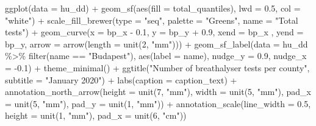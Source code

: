 \documentclass[
]{book}
\newenvironment{Shaded}{\begin{snugshade}}{\end{snugshade}}
\newcommand{\AttributeTok}[1]{\textcolor[rgb]{0.77,0.63,0.00}{#1}}
\newcommand{\DecValTok}[1]{\textcolor[rgb]{0.00,0.00,0.81}{#1}}
\newcommand{\FloatTok}[1]{\textcolor[rgb]{0.00,0.00,0.81}{#1}}
\newcommand{\FunctionTok}[1]{\textcolor[rgb]{0.00,0.00,0.00}{#1}}
\newcommand{\NormalTok}[1]{#1}
\newcommand{\SpecialCharTok}[1]{\textcolor[rgb]{0.00,0.00,0.00}{#1}}
\newcommand{\StringTok}[1]{\textcolor[rgb]{0.31,0.60,0.02}{#1}}
\begin{document}
\begin{Shaded}
\begin{Highlighting}[]
\FunctionTok{ggplot}\NormalTok{(}\AttributeTok{data =}\NormalTok{ hu\_dd) }\SpecialCharTok{+} 
  \FunctionTok{geom\_sf}\NormalTok{(}\FunctionTok{aes}\NormalTok{(}\AttributeTok{fill =}\NormalTok{ total\_quantiles), }\AttributeTok{lwd =} \FloatTok{0.5}\NormalTok{, }\AttributeTok{col =} \StringTok{"white"}\NormalTok{) }\SpecialCharTok{+} 
  \FunctionTok{scale\_fill\_brewer}\NormalTok{(}\AttributeTok{type =} \StringTok{"seq"}\NormalTok{, }\AttributeTok{palette =} \StringTok{"Greens"}\NormalTok{, }\AttributeTok{name =} \StringTok{"Total tests"}\NormalTok{) }\SpecialCharTok{+} 
  \FunctionTok{geom\_curve}\NormalTok{(}\AttributeTok{x =}\NormalTok{ bp\_x }\SpecialCharTok{{-}} \FloatTok{0.1}\NormalTok{, }
             \AttributeTok{y =}\NormalTok{ bp\_y }\SpecialCharTok{+} \FloatTok{0.9}\NormalTok{, }
             \AttributeTok{xend =}\NormalTok{ bp\_x , }
             \AttributeTok{yend =}\NormalTok{ bp\_y, }
             \AttributeTok{arrow =} \FunctionTok{arrow}\NormalTok{(}\AttributeTok{length =} \FunctionTok{unit}\NormalTok{(}\DecValTok{2}\NormalTok{, }\StringTok{"mm"}\NormalTok{))) }\SpecialCharTok{+}
  \FunctionTok{geom\_sf\_label}\NormalTok{(}\AttributeTok{data =}\NormalTok{ hu\_dd }\SpecialCharTok{\%\textgreater{}\%} \FunctionTok{filter}\NormalTok{(name }\SpecialCharTok{==} \StringTok{"Budapest"}\NormalTok{), }
                \FunctionTok{aes}\NormalTok{(}\AttributeTok{label =}\NormalTok{ name), }
                \AttributeTok{nudge\_y =} \FloatTok{0.9}\NormalTok{, }
                \AttributeTok{nudge\_x =} \SpecialCharTok{{-}}\FloatTok{0.1}\NormalTok{) }\SpecialCharTok{+} 
  \FunctionTok{theme\_minimal}\NormalTok{() }\SpecialCharTok{+} 
  \FunctionTok{ggtitle}\NormalTok{(}\StringTok{"Number of breathalyser tests per county"}\NormalTok{, }\AttributeTok{subtitle =} \StringTok{"January 2020"}\NormalTok{) }\SpecialCharTok{+} 
  \FunctionTok{labs}\NormalTok{(}\AttributeTok{caption =}\NormalTok{ caption\_text) }\SpecialCharTok{+} 
  \FunctionTok{annotation\_north\_arrow}\NormalTok{(}\AttributeTok{height =} \FunctionTok{unit}\NormalTok{(}\DecValTok{7}\NormalTok{, }\StringTok{"mm"}\NormalTok{), }\AttributeTok{width =} \FunctionTok{unit}\NormalTok{(}\DecValTok{5}\NormalTok{, }\StringTok{"mm"}\NormalTok{), }\AttributeTok{pad\_x =} \FunctionTok{unit}\NormalTok{(}\DecValTok{5}\NormalTok{, }\StringTok{"mm"}\NormalTok{), }\AttributeTok{pad\_y =} \FunctionTok{unit}\NormalTok{(}\DecValTok{1}\NormalTok{, }\StringTok{"mm"}\NormalTok{)) }\SpecialCharTok{+} 
  \FunctionTok{annotation\_scale}\NormalTok{(}\AttributeTok{line\_width =} \FloatTok{0.5}\NormalTok{, }\AttributeTok{height =} \FunctionTok{unit}\NormalTok{(}\DecValTok{1}\NormalTok{, }\StringTok{"mm"}\NormalTok{), }\AttributeTok{pad\_x =} \FunctionTok{unit}\NormalTok{(}\DecValTok{6}\NormalTok{, }\StringTok{"cm"}\NormalTok{))}
\end{Highlighting}
\end{Shaded}
\end{document}

